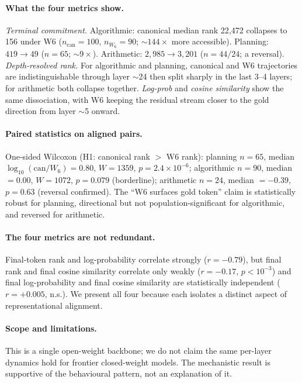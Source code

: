 \paragraph{What the four metrics show.}
\emph{Terminal commitment.} Algorithmic: canonical median rank
22{,}472 collapses to 156 under W6 ($n_{\mathrm{can}}{=}100$,
$n_{W_6}{=}90$; $\sim$$144\times$ more accessible). Planning:
$419{\to}49$ ($n{=}65$; $\sim$$9\times$). Arithmetic: $2{,}985{\to}3{,}201$
($n{=}44/24$; a reversal). \emph{Depth-resolved rank.} For algorithmic and
planning, canonical and W6 trajectories are indistinguishable through layer
$\sim$24 then split sharply in the last 3--4 layers; for arithmetic both
collapse together. \emph{Log-prob} and \emph{cosine similarity} show the same
dissociation, with W6 keeping the residual stream closer to the gold direction
from layer $\sim$5 onward.

\paragraph{Paired statistics on aligned pairs.}
One-sided Wilcoxon (H1: canonical rank $>$ W6 rank): planning $n{=}65$,
median $\log_{10}(\text{can}/W_6){=}0.80$, $W{=}1359$,
$p{=}2.4{\times}10^{-6}$; algorithmic $n{=}90$, median ${=}0.00$, $W{=}1072$,
$p{=}0.079$ (borderline); arithmetic $n{=}24$, median ${=}{-}0.39$,
$p{=}0.63$ (reversal confirmed). The ``W6 surfaces gold token'' claim is
statistically robust for planning, directional but not population-significant
for algorithmic, and reversed for arithmetic.

\paragraph{The four metrics are not redundant.}
Final-token rank and log-probability correlate strongly ($r{=}{-}0.79$), but
final rank and final cosine similarity correlate only weakly
($r{=}{-}0.17$, $p{<}10^{-3}$) and final log-probability and final cosine
similarity are statistically independent ($r{=}{+}0.005$, n.s.). We present
all four because each isolates a distinct aspect of representational
alignment.

\paragraph{Scope and limitations.}
This is a single open-weight backbone; we do not claim the same per-layer
dynamics hold for frontier closed-weight models. The mechanistic result is
supportive of the behavioural pattern, not an explanation of it.


